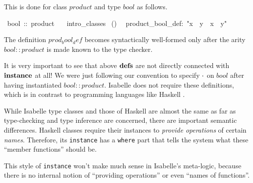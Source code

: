 \begin{isabelle}
\begin{isamarkuptext}
 This is done for class $product$ and type $bool$ as follows.%
\end{isamarkuptext}%
\ bool\ ::\ product\isanewline
\ \ \ intro\_classes\isanewline
{}\ ()\isanewline
\ \ product\_bool\_def:\ {"}x\ {\isasymOtimes}\ y\ {\isasymequiv}\ x\ {\isasymand}\ y{"}%
\begin{isamarkuptext}%
The definition $prod_bool_def$ becomes syntactically well-formed only
 after the arity $bool :: product$ is made known to the type checker.

 \medskip It is very important to see that above ${\mathord{\mathbf{defs}}}$ are not
 directly connected with ${\mathord{\mathbf{instance}}}$ at all!  We were
 just following our convention to specify $\cdot$ on $bool$ after
 having instantiated $bool :: product$.  Isabelle does not require
 these definitions, which is in contrast to programming languages like
 Haskell \cite{haskell-report}.

 \medskip While Isabelle type classes and those of Haskell are almost
 the same as far as type-checking and type inference are concerned,
 there are important semantic differences.  Haskell classes require
 their instances to \emph{provide operations} of certain \emph{names}.
 Therefore, its \texttt{instance} has a \texttt{where} part that tells
 the system what these ``member functions'' should be.

 This style of \texttt{instance} won't make much sense in Isabelle's
 meta-logic, because there is no internal notion of ``providing
 operations'' or even ``names of functions''.%
\end{isamarkuptext}%
\end{isabelle}%
